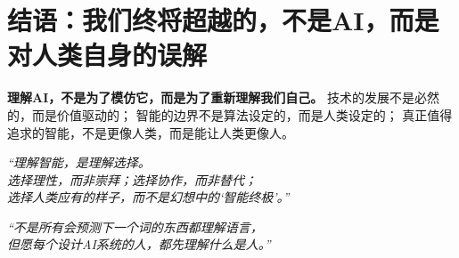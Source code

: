 \section*{结语：我们终将超越的，不是AI，而是对人类自身的误解}
\textbf{理解AI，不是为了模仿它，而是为了重新理解我们自己。}
技术的发展不是必然的，而是价值驱动的；
智能的边界不是算法设定的，而是人类设定的；
真正值得追求的智能，不是更像人类，而是能让人类更像人。
\begin{center}
\textit{
“理解智能，是理解选择。\\
选择理性，而非崇拜；选择协作，而非替代；\\
选择人类应有的样子，而不是幻想中的‘智能终极’。”}
\end{center}
\begin{center}
\textit{
“不是所有会预测下一个词的东西都理解语言，\\
但愿每个设计AI系统的人，都先理解什么是人。”\\
}
\end{center}
\nocite{*}
\printbibliography[heading=bibintoc, title=\ebibname]
\newpage
